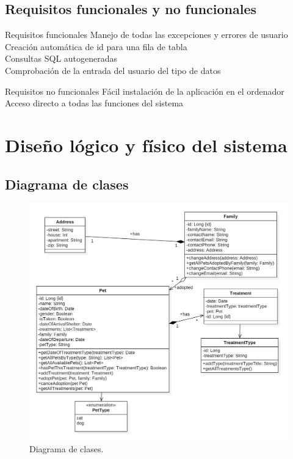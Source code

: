 \documentclass{FR16}
\begin{document}
\newpage

\subsection{Requisitos funcionales y no funcionales}
\begin{center}

\begin{tabularx}{\textwidth}
\hline
Requisitos funcionales
\hline
Manejo de todas las excepciones y errores de usuario \\
Creación automática de id para una fila de tabla \\
Consultas SQL autogeneradas \\
Comprobación de la entrada del usuario del tipo de datos
\end{tabularx}

\begin{tabularx}{\textwidth}
\hline
Requisitos no funcionales
\hline
Fácil instalación de la aplicación en el ordenador \\
Acceso directo a todas las funciones del sistema
\end{tabularx}

\end{center}

\newpage

\section{Diseño lógico y físico del sistema}
\subsection{Diagrama de clases}
\begin{figure}[H]
\justifying
\includegraphics[width=1\textwidth]{Logical View.png}
\caption{\label{fig:1}Diagrama de clases.}
\end{figure}
\end{document}
